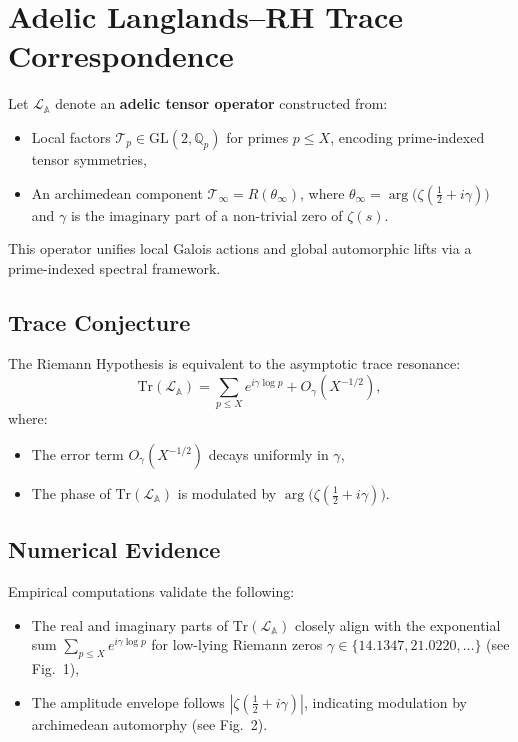 \documentclass[12]{amsart}
\theoremstyle{plain}
\begin{document}
\section{Adelic Langlands–RH Trace Correspondence}

Let $\mathcal{L}_{\mathbb{A}}$ denote an \textbf{adelic tensor operator} constructed from:
\begin{itemize}
    \item Local factors $\mathcal{T}_p \in \mathrm{GL}(2, \mathbb{Q}_p)$ for primes $p \leq X$, encoding prime-indexed tensor symmetries,
    \item An archimedean component $\mathcal{T}_\infty = R(\theta_\infty)$, where $\theta_\infty = \arg\big(\zeta(\tfrac{1}{2} + i\gamma)\big)$ and $\gamma$ is the imaginary part of a non-trivial zero of $\zeta(s)$.
\end{itemize}
This operator unifies local Galois actions and global automorphic lifts via a prime-indexed spectral framework.

\subsection{Trace Conjecture}
\begin{conjecture}
The Riemann Hypothesis is equivalent to the asymptotic trace resonance:
\begin{equation}
\mathrm{Tr}(\mathcal{L}_{\mathbb{A}}) = \sum_{p \leq X} e^{i \gamma \log p} + O_{\gamma}(X^{-1/2}),
\end{equation}
where:
\begin{itemize}
    \item The error term $O_{\gamma}(X^{-1/2})$ decays uniformly in $\gamma$,
    \item The phase of $\mathrm{Tr}(\mathcal{L}_{\mathbb{A}})$ is modulated by $\arg\big(\zeta(\tfrac{1}{2} + i\gamma)\big)$.
\end{itemize}
\end{conjecture}

\subsection{Numerical Evidence}
Empirical computations validate the following:
\begin{itemize}
    \item The real and imaginary parts of $\mathrm{Tr}(\mathcal{L}_{\mathbb{A}})$ closely align with the exponential sum $\sum_{p \leq X} e^{i \gamma \log p}$ for low-lying Riemann zeros $\gamma \in \{14.1347, 21.0220, \dots\}$ (see Fig.~1),
    \item The amplitude envelope follows $|\zeta(\tfrac{1}{2} + i\gamma)|$, indicating modulation by archimedean automorphy (see Fig.~2).
\end{itemize}
\end{document}
